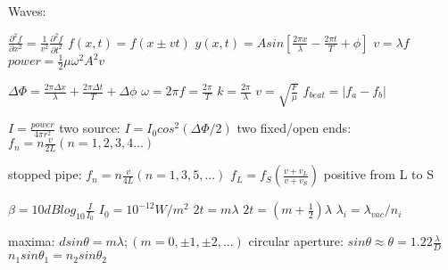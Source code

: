 \documentclass{exam}
\begin{document}
\noindent
Waves: \vspace{2mm}

\noindent
$\frac{\partial^2f}{\partial x^2}=\frac{1}{v^2}\frac{\partial^2f}{\partial t^2}$
$f(x,t) = f(x \pm vt)$
$y(x,t) = A sin\left[\frac{2\pi x}{\lambda}-\frac{2\pi t}{T}+\phi\right]$
$v = \lambda f$
$power = \frac{1}{2} \mu \omega^2 A^2 v$

\noindent
$\Delta \Phi = \frac{2\pi \Delta x}{\lambda}+\frac{2\pi \Delta t}{T}+\Delta \phi$
$\omega = 2\pi f = \frac{2\pi}{T}$
$k=\frac{2\pi}{\lambda}$
$v=\sqrt{\frac{F}{\mu}}$
$f_{beat}=|f_a-f_b|$

\noindent
$I = \frac{power}{4\pi r^2}$
two source: $I = I_0 cos^2(\Delta \Phi/2)$
two fixed/open ends: $f_n=n\frac{v}{2L}(n=1,2,3,4...)$

\noindent
stopped pipe: $f_n = n\frac{v}{4L} (n=1, 3, 5, ...)$
$f_L=f_S\left( \frac{v+v_L}{v+v_S}\right)$ positive from L to S


\noindent
$\beta = 10dB log_{10}\frac{I}{I_0}$
\hspace{2mm}
$I_0=10^{-12}W/m^2$
$2t = m\lambda$
\hspace{4mm}
$2t = (m+\frac{1}{2})\lambda$
$\lambda_i = \lambda_{vac}/n_i$

\noindent
maxima: $d sin\theta = m\lambda; (m=0, \pm1, \pm2, ...)$
circular aperture: $sin\theta \approx \theta=1.22\frac{\lambda}{D}$
$n_1 sin\theta_1=n_2 sin\theta_2$
\end{document}
